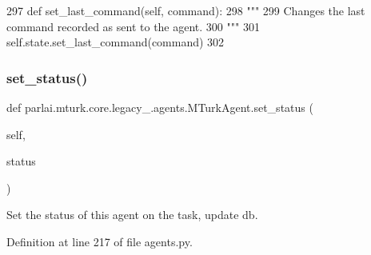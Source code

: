 \begin{DoxyCode}
297     \textcolor{keyword}{def }set\_last\_command(self, command):
298         \textcolor{stringliteral}{"""}
299 \textcolor{stringliteral}{        Changes the last command recorded as sent to the agent.}
300 \textcolor{stringliteral}{        """}
301         self.state.set\_last\_command(command)
302 
\end{DoxyCode}
\mbox{\label{classparlai_1_1mturk_1_1core_1_1legacy__2018_1_1agents_1_1MTurkAgent_aba01d9584efeeefa0db8abd7c1f1092e}} 
\subsubsection{\texorpdfstring{set\+\_\+status()}{set\_status()}}
{\footnotesize\ttfamily def parlai.\+mturk.\+core.\+legacy\+\_.\+agents.\+M\+Turk\+Agent.\+set\+\_\+status (\begin{DoxyParamCaption}\item[{}]{self,  }\item[{}]{status }\end{DoxyParamCaption})}

\begin{DoxyVerb}Set the status of this agent on the task, update db.
\end{DoxyVerb}
 

Definition at line 217 of file agents.\+py.


